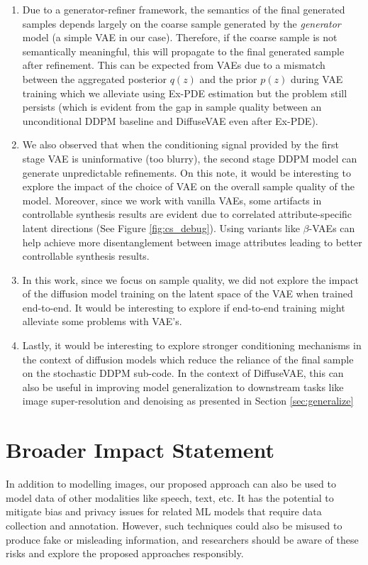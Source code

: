 \documentclass[10pt]{article} \usepackage[accepted]{tmlr}
\begin{document}
\begin{enumerate}
    \item Due to a generator-refiner framework, the semantics of the final generated samples depends largely on the coarse sample generated by the \textit{generator} model (a simple VAE in our case). Therefore, if the coarse sample is not semantically meaningful, this will propagate to the final generated sample after refinement. This can be expected from VAEs due to a mismatch between the aggregated posterior $q(z)$ and the prior $p(z)$ during VAE training which we alleviate using Ex-PDE estimation but the problem still persists (which is evident from the gap in sample quality between an unconditional DDPM baseline and DiffuseVAE even after Ex-PDE).
    
    \item We also observed that when the conditioning signal provided by the first stage VAE is uninformative (too blurry), the second stage DDPM model can generate unpredictable refinements. On this note, it would be interesting to explore the impact of the choice of VAE on the overall sample quality of the model. Moreover, since we work with vanilla VAEs, some artifacts in controllable synthesis results are evident due to correlated attribute-specific latent directions (See Figure \ref{fig:cs_debug}). Using variants like $\beta$-VAEs \citep{Higgins2017betaVAELB} can help achieve more disentanglement between image attributes leading to better controllable synthesis results.
    
    \item In this work, since we focus on sample quality, we did not explore the impact of the diffusion model training on the latent space of the VAE when trained end-to-end. It would be interesting to explore if end-to-end training might alleviate some problems with VAE's.
    
    \item Lastly, it would be interesting to explore stronger conditioning mechanisms in the context of diffusion models which reduce the reliance of the final sample on the stochastic DDPM sub-code. In the context of DiffuseVAE, this can also be useful in improving model generalization to downstream tasks like image super-resolution and denoising as presented in Section \ref{sec:generalize}
\end{enumerate}





\section*{Broader Impact Statement}
In addition to modelling images, our proposed approach can also be used to model data of other modalities like speech, text, etc. It has the potential to mitigate bias and privacy issues for related ML models that require data collection and annotation. However, such techniques could also be misused to produce fake or misleading information, and researchers should be aware of these risks and explore the proposed approaches responsibly.
\end{document}
